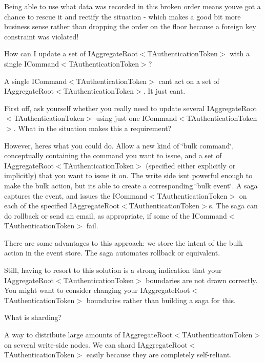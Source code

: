 Being able to use what data was recorded in this broken order means you\textquotesingle{}ve got a chance to rescue it and rectify the situation -\/ which makes a good bit more business sense rather than dropping the order on the floor because a foreign key constraint was violated! 

How can I update a set of I\+Aggregate\+Root$<$\+T\+Authentication\+Token$>$ with a single I\+Command$<$\+T\+Authentication\+Token$>$? 

A single I\+Command$<$\+T\+Authentication\+Token$>$ can\textquotesingle{}t act on a set of I\+Aggregate\+Root$<$\+T\+Authentication\+Token$>$. It just can\textquotesingle{}t. 

First off, ask yourself whether you really need to update several I\+Aggregate\+Root$<$\+T\+Authentication\+Token$>$ using just one I\+Command$<$\+T\+Authentication\+Token$>$. What in the situation makes this a requirement? 

However, here\textquotesingle{}s what you could do. Allow a new kind of \char`\"{}bulk command\char`\"{}, conceptually containing the command you want to issue, and a set of I\+Aggregate\+Root$<$\+T\+Authentication\+Token$>$ (specified either explicitly or implicitly) that you want to issue it on. The write side isn\textquotesingle{}t powerful enough to make the bulk action, but it\textquotesingle{}s able to create a corresponding \char`\"{}bulk event\char`\"{}. A saga captures the event, and issues the I\+Command$<$\+T\+Authentication\+Token$>$ on each of the specified I\+Aggregate\+Root$<$\+T\+Authentication\+Token$>$s. The saga can do rollback or send an email, as appropriate, if some of the I\+Command$<$\+T\+Authentication\+Token$>$ fail. 

There are some advantages to this approach\+: we store the intent of the bulk action in the event store. The saga automates rollback or equivalent. 

Still, having to resort to this solution is a strong indication that your I\+Aggregate\+Root$<$\+T\+Authentication\+Token$>$ boundaries are not drawn correctly. You might want to consider changing your I\+Aggregate\+Root$<$\+T\+Authentication\+Token$>$ boundaries rather than building a saga for this. 

What is sharding? 

A way to distribute large amounts of I\+Aggregate\+Root$<$\+T\+Authentication\+Token$>$ on several write-\/side nodes. We can shard I\+Aggregate\+Root$<$\+T\+Authentication\+Token$>$ easily because they are completely self-\/reliant. 

